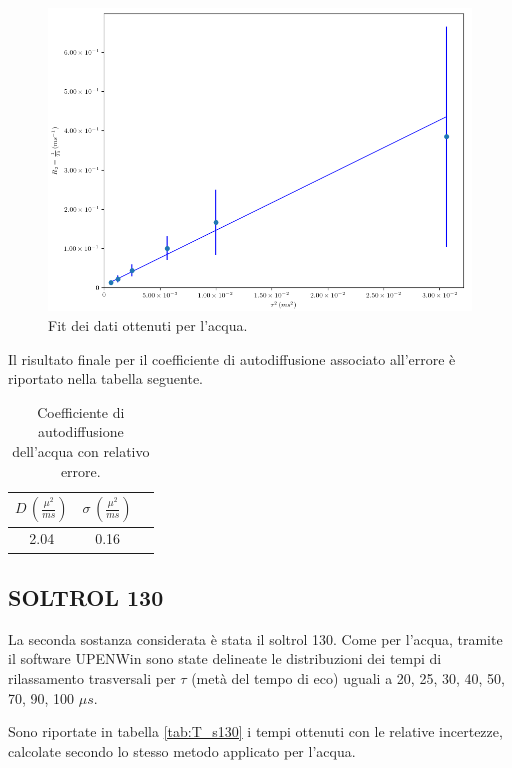 \begin{figure}[p]
\centering
\includegraphics[width=\columnwidth]{Figure/H2O_calc.png}
\caption{Fit dei dati ottenuti per l'acqua.}
\label{fig:Df_h2o}
\end{figure}
\newpage
Il risultato finale per il coefficiente di autodiffusione associato all'errore è riportato nella tabella seguente.

\begin{table}
    \begin{center}
    \begin{tabular}{c c c}
    \toprule
    	$D\,(\frac{{\mu}^2}{ms})$ & $\sigma\,(\frac{{\mu}^2}{ms})$ \\
    \midrule
    	2.04	&	0.16	\\
    \bottomrule
    \end{tabular}
    \caption{Coefficiente di autodiffusione dell'acqua con relativo errore.}
    \label{tab:Df_h2o}
    \end{center}
\end{table}


\subsection*{SOLTROL 130}

La seconda sostanza considerata è stata il soltrol 130.
Come per l'acqua, tramite il software UPENWin sono state delineate le distribuzioni dei tempi di rilassamento trasversali per $\tau$ (metà del tempo di eco) uguali a 20, 25, 30, 40, 50, 70, 90, 100 ${\mu}s$.

Sono riportate in tabella \ref{tab:T_s130} i tempi ottenuti con le relative incertezze, calcolate secondo lo stesso metodo applicato per l'acqua.


